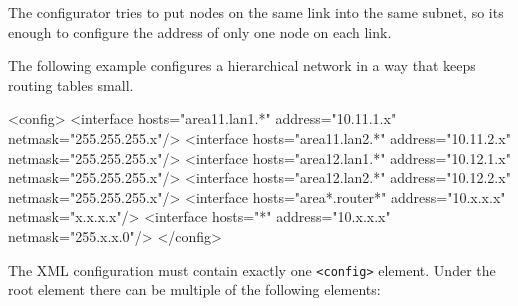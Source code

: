 The configurator tries to put nodes on the same link into the same subnet,
so its enough to configure the address of only one node on each link.

The following example configures a hierarchical network in a way that keeps
routing tables small.
\begin{XML}
<config>
  <interface hosts="area11.lan1.*" address="10.11.1.x" netmask="255.255.255.x"/>
  <interface hosts="area11.lan2.*" address="10.11.2.x" netmask="255.255.255.x"/>
  <interface hosts="area12.lan1.*" address="10.12.1.x" netmask="255.255.255.x"/>
  <interface hosts="area12.lan2.*" address="10.12.2.x" netmask="255.255.255.x"/>
  <interface hosts="area*.router*" address="10.x.x.x" netmask="x.x.x.x"/>
  <interface hosts="*" address="10.x.x.x" netmask="255.x.x.0"/>
</config>
\end{XML}

The XML configuration must contain exactly one \verb!<config>! element. Under the
root element there can be multiple of the following elements:

